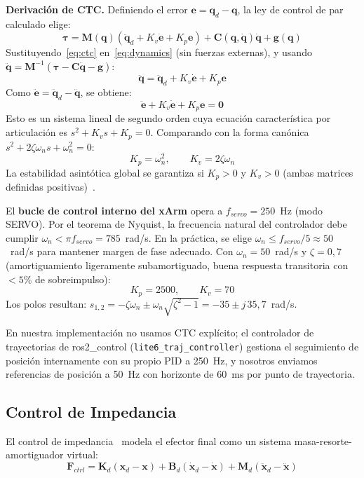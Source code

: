 \documentclass[journal,10pt,twoside]{IEEEtran}
\begin{document}
\textbf{Derivación de CTC.}
Definiendo el error $\bm{e}=\bm{q}_d-\bm{q}$, la ley de control de
par calculado elige:
\begin{equation}
  \bm{\tau} = \bm{M}(\bm{q})\left(\ddot{\bm{q}}_d + K_v\dot{\bm{e}}
              + K_p\bm{e}\right)
              + \bm{C}(\bm{q},\dot{\bm{q}})\dot{\bm{q}} + \bm{g}(\bm{q})
  \label{eq:ctc}
\end{equation}
Sustituyendo~\eqref{eq:ctc} en~\eqref{eq:dynamics} (sin fuerzas externas),
y usando $\ddot{\bm{q}}=\bm{M}^{-1}(\bm{\tau}-\bm{C}\dot{\bm{q}}-\bm{g})$:
\[
  \ddot{\bm{q}} = \ddot{\bm{q}}_d + K_v\dot{\bm{e}} + K_p\bm{e}
\]
Como $\ddot{\bm{e}}=\ddot{\bm{q}}_d-\ddot{\bm{q}}$, se obtiene:
\[
  \ddot{\bm{e}} + K_v\dot{\bm{e}} + K_p\bm{e} = \bm{0}
\]
Esto es un sistema lineal de segundo orden cuya ecuación característica
por articulación es $s^2+K_v s+K_p=0$. Comparando con la forma canónica
$s^2+2\zeta\omega_n s+\omega_n^2=0$:
\[
  K_p = \omega_n^2, \qquad K_v = 2\zeta\omega_n
\]
La estabilidad asintótica global se garantiza si $K_p>0$ y $K_v>0$
(ambas matrices definidas positivas)~\cite{spong2006}.


El \textbf{bucle de control interno del xArm} opera a $f_{servo}=250$~Hz
(modo SERVO). Por el teorema de Nyquist, la frecuencia natural del
controlador debe cumplir $\omega_n < \pi f_{servo} = 785$~rad/s.
En la práctica, se elige $\omega_n \leq f_{servo}/5 \approx 50$~rad/s
para mantener margen de fase adecuado. Con $\omega_n=50$~rad/s y
$\zeta=0{,}7$ (amortiguamiento ligeramente subamortiguado, buena
respuesta transitoria con $<5\%$ de sobreimpulso):
\[
  K_p = 2500, \qquad K_v = 70
\]
Los polos resultan: $s_{1,2}=-\zeta\omega_n\pm\omega_n\sqrt{\zeta^2-1}
= -35 \pm j\,35{,}7$~rad/s.

En nuestra implementación no usamos CTC explícito; el controlador de
trayectorias de ros2\_control (\texttt{lite6\_traj\_controller}) gestiona
el seguimiento de posición internamente con su propio PID a 250~Hz, y
nosotros enviamos referencias de posición a 50~Hz con horizonte de
60~ms por punto de trayectoria.

\subsection{Control de Impedancia}

El control de impedancia~\cite{hogan1985} modela el efector final como
un sistema masa-resorte-amortiguador virtual:
\begin{equation}
  \bm{F}_{ctrl} = \bm{K}_d(\bm{x}_d - \bm{x})
                + \bm{B}_d(\dot{\bm{x}}_d - \dot{\bm{x}})
                + \bm{M}_d(\ddot{\bm{x}}_d - \ddot{\bm{x}})
  \label{eq:impedance}
\end{equation}
\end{document}
